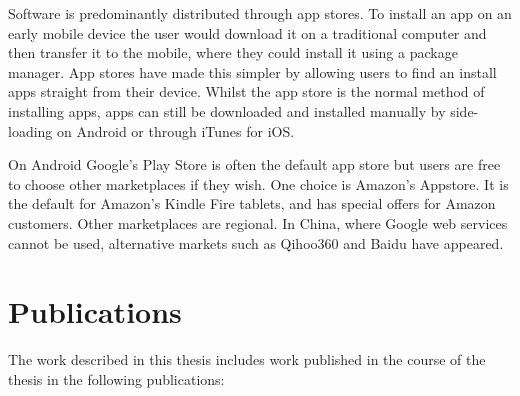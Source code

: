 \documentclass[thesis.tex]{subfiles}
\begin{document}
Software is predominantly distributed through app stores.
To install an app on an early mobile device the user would
download it on a traditional computer and then transfer it to the
mobile, where they could install it using a package manager.  App
stores have made this simpler by allowing users to find
an install apps straight from their device.  Whilst the app store is
the normal method of installing apps, apps can still be downloaded and
installed manually by side-loading on Android or through iTunes for
iOS.

On Android Google's Play Store is often the
default app store but users are free to choose other marketplaces if they wish.
One choice is Amazon's Appstore.  It is the default for Amazon's
Kindle Fire tablets, and has special offers for Amazon customers.
Other marketplaces are regional.  In China, where Google web services
cannot be used, alternative markets such as Qihoo360 and Baidu have
appeared.

\section{Publications}

The work described in this thesis includes work published in the course of the thesis in the following publications:
\end{document}
